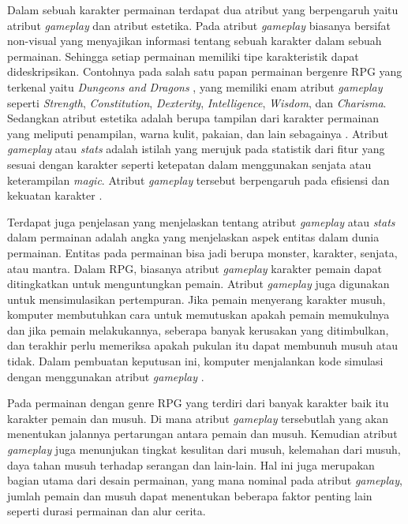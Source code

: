 Dalam sebuah karakter permainan terdapat dua atribut yang berpengaruh yaitu atribut \textit{gameplay} dan atribut estetika. Pada atribut \textit{gameplay} biasanya bersifat non-visual yang menyajikan informasi tentang sebuah karakter dalam sebuah permainan. Sehingga setiap permainan memiliki tipe karakteristik dapat dideskripsikan. Contohnya pada salah satu papan permainan bergenre RPG yang terkenal yaitu \textit{Dungeons and Dragons} \citep{heinsoo2008}, yang memiliki enam atribut \textit{gameplay} seperti \textit{Strength}, \textit{Constitution}, \textit{Dexterity}, \textit{Intelligence}, \textit{Wisdom}, dan \textit{Charisma}. Sedangkan atribut estetika adalah berupa tampilan dari karakter permainan yang meliputi penampilan, warna kulit, pakaian, dan lain sebagainya \citep{camelo2014}. Atribut \textit{gameplay} atau \textit{stats} adalah istilah yang merujuk pada statistik dari fitur yang sesuai dengan karakter seperti ketepatan dalam menggunakan senjata atau keterampilan \textit{magic}. Atribut \textit{gameplay} tersebut berpengaruh pada efisiensi dan kekuatan karakter \citep{wenz2013}. 
\vspace{1ex}

Terdapat juga penjelasan yang menjelaskan tentang atribut \textit{gameplay} atau \textit{stats} dalam permainan adalah angka yang menjelaskan aspek entitas dalam dunia permainan. Entitas pada permainan bisa jadi berupa monster, karakter, senjata, atau mantra. Dalam RPG, biasanya atribut \textit{gameplay} karakter pemain dapat ditingkatkan untuk menguntungkan pemain. Atribut \textit{gameplay} juga digunakan untuk mensimulasikan pertempuran. Jika pemain menyerang karakter musuh, komputer membutuhkan cara untuk memutuskan apakah pemain memukulnya dan jika pemain melakukannya, seberapa banyak kerusakan yang ditimbulkan, dan terakhir perlu memeriksa apakah pukulan itu dapat membunuh musuh atau tidak. Dalam pembuatan keputusan ini, komputer menjalankan kode simulasi dengan menggunakan atribut \textit{gameplay} \citep{danschuller2020}.
\vspace{1ex}

Pada permainan dengan genre RPG yang terdiri dari banyak karakter baik itu karakter pemain dan musuh. Di mana atribut \textit{gameplay} tersebutlah yang akan menentukan jalannya pertarungan antara pemain dan musuh. Kemudian atribut \textit{gameplay} juga menunjukan tingkat kesulitan dari musuh, kelemahan dari musuh, daya tahan musuh terhadap serangan dan lain-lain. Hal ini juga merupakan bagian utama dari desain permainan, yang mana nominal pada atribut \textit{gameplay}, jumlah pemain dan musuh dapat menentukan beberapa faktor penting lain seperti durasi permainan dan alur cerita. 
\vspace{1ex}

